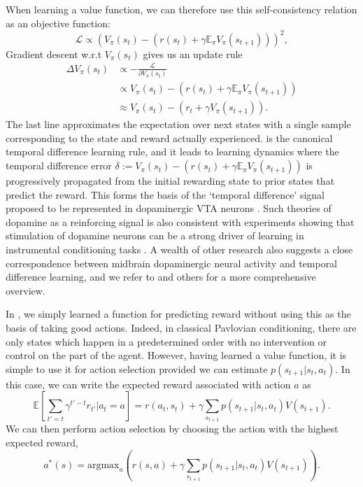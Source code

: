 When learning a value function, we can therefore use this self-consistency relation as an objective function:
\begin{equation}
    \mathcal{L} \propto \left (  V_\pi(s_t) - (r(s_t) + \gamma \mathbb{E}_\pi V_{\pi}(s_{t+1})) \right )^2,
\end{equation}
Gradient descent w.r.t $V_\pi(s_t)$ gives us an update rule
\begin{align}
    \label{eq:TD-learning}
    \Delta V_\pi(s_t) &\propto - \frac{\mathcal{L}}{\partial V_\pi(s_t)}\\
    &\propto V_\pi(s_t) - (r(s_t) + \gamma \mathbb{E}_\pi V_{\pi}(s_{t+1}))\\
    &\approx V_\pi(s_t) - (r_t + \gamma V_{\pi}(s_{t+1})).
\end{align}
The last line approximates the expectation over next states with a single sample corresponding to the state and reward actually experienced.
 is the canonical temporal difference learning rule, and it leads to learning dynamics where the temporal difference error $\delta := V_\pi(s_t) - (r(s_t) + \gamma \mathbb{E}_\pi V_{\pi}(s_{t+1}))$ is progressively propagated from the initial rewarding state to prior states that predict the reward.
This forms the basis of the `temporal difference' signal proposed to be represented in dopaminergic VTA neurons \citep{schultz1997neural}.
Such theories of dopamine as a reinforcing signal is also consistent with experiments showing that stimulation of dopamine neurons can be a strong driver of learning in instrumental conditioning tasks \citep{olds1954positive, tsai2009phasic}.
A wealth of other research also suggests a close correspondence between midbrain dopaminergic neural activity and temporal difference learning, and we refer to \citet{niv2009reinforcement} and others for a more comprehensive overview.

In , we simply learned a function for predicting reward without using this as the basis of taking good actions.
Indeed, in classical Pavlovian conditioning, there are only states which happen in a predetermined order with no intervention or control on the part of the agent.
However, having learned a value function, it is simple to use it for action selection provided we can estimate $p(s_{t+1} | s_t, a_t)$.
In this case, we can write the expected reward associated with action $a$ as
\begin{equation}
    \mathbb{E} \left [\sum_{t' = t} \gamma^{t'-t} r_{t'} | a_t = a \right ] = r(a_t, s_t) + \gamma \sum_{s_{t+1}} p(s_{t+1} | s_t, a_t) V(s_{t+1}).
\end{equation}
We can then perform action selection by choosing the action with the highest expected reward,
\begin{equation}
    \label{eq:value_action_selection}
    a^*(s) = \text{argmax}_{a} \left ( r(s, a) + \gamma \sum_{s_{t+1}} p(s_{t+1} | s_t, a_t) V(s_{t+1}) \right ).
\end{equation}

